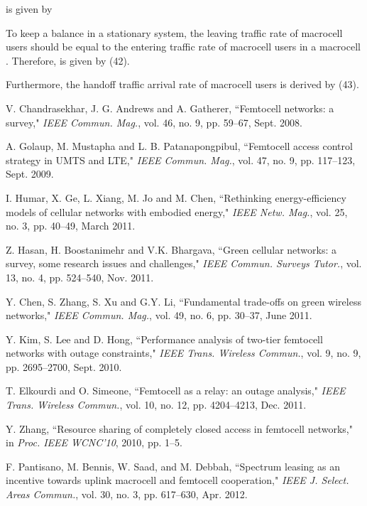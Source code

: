 \documentclass[10pt,final,journal,letterpaper,twoside,twocolumn]{IEEEtran}
\begin{document}
 is given by


To keep a balance in a stationary system, the leaving traffic rate of
macrocell users should be equal to the entering traffic rate of macrocell
users in a macrocell \cite{Lin10}. Therefore,  is given by (42).

Furthermore, the handoff traffic arrival rate of macrocell users  is
derived by (43).







\begin{thebibliography}{1}
V. Chandrasekhar, J. G. Andrews and A. Gatherer, ``Femtocell networks: a
survey," {\em IEEE Commun. Mag.}, vol. 46, no. 9, pp. 59--67, Sept. 2008.

A. Golaup, M. Mustapha and L. B. Patanapongpibul, ``Femtocell access control
strategy in UMTS and LTE," {\em IEEE Commun. Mag.}, vol. 47, no. 9, pp.
117--123, Sept. 2009.

I. Humar, X. Ge, L. Xiang, M. Jo and M. Chen, ``Rethinking energy-efficiency
models of cellular networks with embodied energy," {\em IEEE Netw. Mag.},
vol. 25, no. 3, pp. 40--49, March 2011.

Z. Hasan, H. Boostanimehr and V.K. Bhargava, ``Green cellular networks: a survey,
some research issues and challenges," {\em IEEE Commun. Surveys  Tutor.},
vol. 13, no. 4, pp. 524--540, Nov. 2011.

Y. Chen, S. Zhang, S. Xu and G.Y. Li, ``Fundamental trade-offs on green wireless
networks," {\em IEEE Commun. Mag.}, vol. 49, no. 6, pp. 30--37, June 2011.

Y. Kim, S. Lee and D. Hong, ``Performance analysis of two-tier femtocell
networks with outage constraints," {\em IEEE Trans. Wireless Commun.}, vol.
9, no. 9, pp. 2695--2700, Sept. 2010.

T. Elkourdi and O. Simeone, ``Femtocell as a relay: an outage analysis," {\em
IEEE Trans. Wireless Commun.}, vol. 10, no. 12, pp. 4204--4213, Dec. 2011.

Y. Zhang, ``Resource sharing of completely closed access in femtocell
networks," in {\em Proc. IEEE WCNC'10}, 2010, pp. 1--5.

F. Pantisano, M. Bennis, W. Saad, and M. Debbah, ``Spectrum leasing as an incentive towards uplink macrocell and femtocell cooperation," {\em  IEEE J. Select. Areas Commun.}, vol. 30, no. 3, pp. 617--630, Apr. 2012.


\end{thebibliography}
\end{document}
